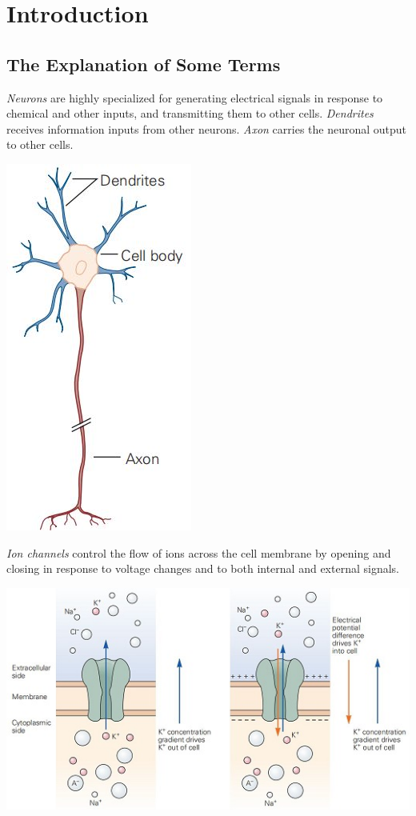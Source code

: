 \section{Introduction}
\subsection{The Explanation of Some Terms}
\rem \emph{Neurons} are highly specialized for generating electrical signals in response to chemical and other inputs, and transmitting them to other cells.
\rem \emph{Dendrites} receives information inputs from other neurons.
\rem \emph{Axon} carries the neuronal output to other cells.
\begin{center}
    \label{fig:1.1}
    \includegraphics[scale = 0.35]{png/Figure1-1}\\
\end{center}

\rem \emph{Ion channels} control the flow of ions across the cell membrane by opening and closing in response to voltage changes and to both internal and external signals.
\begin{center}
  \label{fig:1.2}
  \includegraphics[scale = 0.55]{png/Figure1-2}\\
\end{center}
  
